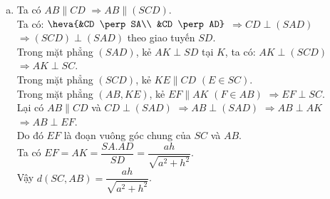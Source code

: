 \begin{vd}
{\begin{enumerate}[a)]
	Ta có $\dfrac{OH}{OC} = \dfrac{SA}{SC} = \sin \widehat{ACS}$ $\Rightarrow OH = \dfrac{OC.SA}{SC} = \dfrac{a\sqrt{2}}{2}\cdot \dfrac{h}{\sqrt{h^2 + 2a^2}}$.\\
	Vậy $d(SC, BD) = OH = \dfrac{ah\sqrt{2}}{2\sqrt{h^2 + 2a^2}}$.
	\item Ta có $AB \parallel CD$ $\Rightarrow AB \parallel (SCD)$.\\
	Ta có: $\heva{&CD \perp SA\\ &CD \perp AD}$ $\Rightarrow CD \perp (SAD)$ $\Rightarrow (SCD) \perp (SAD)$ theo giao tuyến $SD$.\\
	Trong mặt phẳng $(SAD)$, kẻ $AK \perp SD$ tại $K$, ta có: $AK \perp (SCD)$ $\Rightarrow AK \perp SC$.\\
	Trong mặt phẳng $(SCD)$, kẻ $KE \parallel CD$ $(E \in SC)$.\\
	Trong mặt phẳng $(AB, KE)$, kẻ $EF \parallel AK$ $(F \in AB)$ $\Rightarrow EF \perp SC$.\\
	Lại có $AB \parallel CD$ và $CD \perp (SAD)$ $\Rightarrow AB \perp (SAD)$ $\Rightarrow AB \perp AK$ $\Rightarrow AB \perp EF$.\\
	Do đó $EF$ là đoạn vuông góc chung của $SC$ và $AB$.\\
	Ta có $EF = AK = \dfrac{SA.AD}{SD} = \dfrac{ah}{\sqrt{a^2 + h^2}}$.\\
	Vậy $d(SC, AB) = \dfrac{ah}{\sqrt{a^2 + h^2}}$.
	\end{enumerate}
	}
\end{vd}
